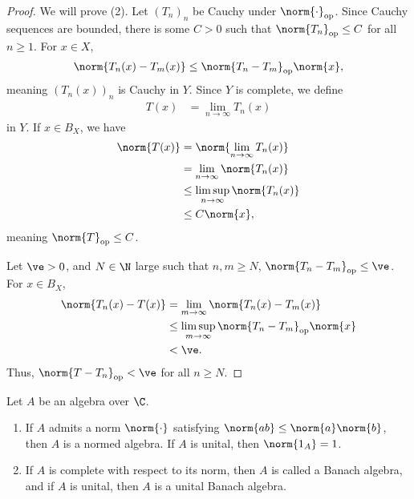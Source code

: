 \documentclass[10pt]{mypackage}
\begin{document}
\begin{proof}
  We will prove (2). Let $\left(T_n\right)_n$ be Cauchy under $\norm{\cdot}_{\text{op}}$. Since Cauchy sequences are bounded, there is some $C > 0$ such that $\norm{T_n}_{\text{op}}\leq C$ for all $n\geq 1$. For $x\in X$,
  \begin{align*}
    \norm{T_n(x) - T_m(x)} \leq \norm{T_n - T_m}_{\text{op}}\norm{x},
  \end{align*}
  meaning $\left(T_n(x)\right)_{n}$ is Cauchy in $Y$. Since $Y$ is complete, we define
  \begin{align*}
    T(x) &= \lim_{n\rightarrow\infty}T_n(x)
  \end{align*}
  in $Y$. If $x\in B_X$, we have
  \begin{align*}
    \norm{T(x)} &= \norm{\lim_{n\rightarrow\infty}T_n(x)}\\
                &= \lim_{n\rightarrow\infty}\norm{T_n(x)}\\
                &\leq \limsup_{n\rightarrow\infty}\norm{T_n(x)}\\
                &\leq C\norm{x},
  \end{align*}
  meaning $\norm{T}_{\text{op}} \leq C$.\newline

  Let $\ve > 0$, and $N\in \N$ large such that $n,m\geq N$, $\norm{T_n - T_m}_{\text{op}} \leq \ve$. For $x\in B_X$,
  \begin{align*}
    \norm{T_n(x)-T(x)} &= \lim_{m\rightarrow\infty}\norm{T_n(x)-T_m(x)}\\
                      &\leq \limsup_{m\rightarrow\infty}\norm{T_n - T_m}_{\text{op}}\norm{x}\\
                      &< \ve.
  \end{align*}
  Thus, $\norm{T - T_n}_{\text{op}} < \ve$ for all $n\geq N$.
\end{proof}
\begin{definition}[Algebras]
  Let $A$ be an algebra over $\C$.
  \begin{enumerate}[(1)]
    \item If $A$ admits a norm $\norm{\cdot}$ satisfying $\norm{ab} \leq \norm{a}\norm{b}$, then $A$ is a normed algebra. If $A$ is unital, then $\norm{1_A} = 1$.
    \item If $A$ is complete with respect to its norm, then $A$ is called a Banach algebra, and if $A$ is unital, then $A$ is a unital Banach algebra.
  \end{enumerate}
\end{definition}
\end{document}
